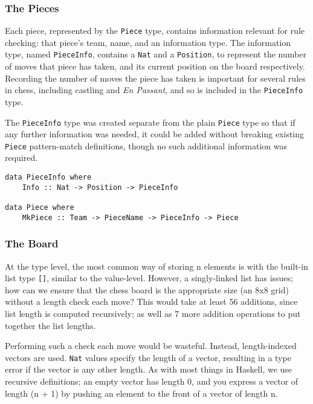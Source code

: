 \documentclass[12pt, a4paper, bibliography=totocnumbered]{scrartcl}
\begin{document}
\subsubsection{The Pieces}

Each piece, represented by the \lstinline{Piece} type, contains information relevant for rule checking: that piece's team, name, and an information type. The information type, named \lstinline{PieceInfo}, contains a \lstinline{Nat} and a \lstinline{Position}, to represent the number of moves that piece has taken, and its current position on the board respectively. Recording the number of moves the piece has taken is important for several rules in chess, including castling and \textit{En Passant}, and so is included in the \lstinline{PieceInfo} type.

The \lstinline{PieceInfo} type was created separate from the plain \lstinline{Piece} type so that if any further information was needed, it could be added without breaking existing \lstinline{Piece} pattern-match definitions, though no such additional information was required.

\begin{lstlisting}
data PieceInfo where
    Info :: Nat -> Position -> PieceInfo

data Piece where
    MkPiece :: Team -> PieceName -> PieceInfo -> Piece
\end{lstlisting}

\subsubsection{The Board}

At the type level, the most common way of storing n elements is with the built-in list type \lstinline{[]}, similar to the value-level. However, a singly-linked list has issues; how can we ensure that the chess board is the appropriate size (an 8x8 grid) without a length check each move? This would take at least 56 additions, since list length is computed recursively; as well as 7 more addition operations to put together the list lengths.

Performing such a check each move would be wasteful. Instead, length-indexed vectors are used. \lstinline{Nat} values specify the length of a vector, resulting in a type error if the vector is any other length. As with most things in Haskell, we use recursive definitions; an empty vector has length 0, and you express a vector of length (n + 1) by pushing an element to the front of a vector of length n.
\end{document}
